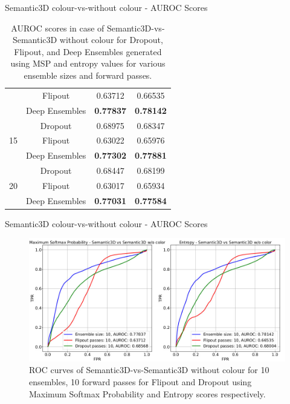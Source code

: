 \documentclass[aspectratio=169]{beamer}
\begin{document}
\begin{frame}{Semantic3D colour-vs-without colour - AUROC Scores}
\begin{table}[h!]
{\begin{tabular}{cccc}
                                & Flipout              & 0.63712          & 0.66535          \\
                                & Deep Ensembles       & \textbf{0.77837} & \textbf{0.78142} \\ \hline
        \multirow{3}{*}{15}     & Dropout              & 0.68975          & 0.68347          \\
                                & Flipout              & 0.63022           & 0.65976          \\
                                & Deep Ensembles       & \textbf{0.77302} & \textbf{0.77881} \\ \hline
        \multirow{3}{*}{20}     & Dropout              & 0.68447          & 0.68199          \\
                                & Flipout              & 0.63017          & 0.65934          \\
                                & Deep Ensembles       & \textbf{0.77031} & \textbf{0.77584} \\ \hline
        \end{tabular}
        }
        \caption{AUROC scores in case of Semantic3D-vs-Semantic3D without colour for Dropout, Flipout, and  Deep Ensembles generated using MSP and entropy values for various ensemble sizes and forward passes.}
        \label{tab:auroc_ood_2}
    \end{table}
\end{frame}
\begin{frame}{Semantic3D colour-vs-without colour - AUROC Scores}
    \begin{figure}
        \centering
        \includegraphics[scale=0.3]{images/ood2_roc_curves.jpg}
        \caption{ROC curves of Semantic3D-vs-Semantic3D without colour for 10 ensembles, 10 forward
        passes for Flipout and Dropout using Maximum Softmax Probability and Entropy scores respectively.}
    \end{figure}
\end{frame}
\end{document}
